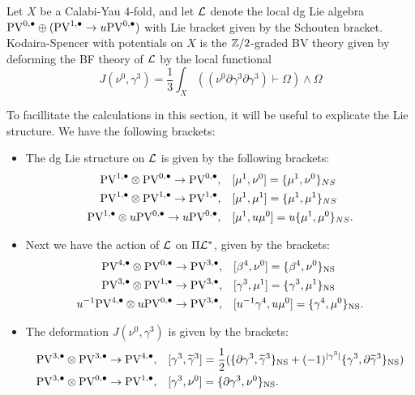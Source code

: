\documentclass[11pt]{amsart}
\def\PV{{\rm PV}}
\begin{document}
\begin{dfn}
  Let $X$ be a Calabi-Yau 4-fold, and let $\mathcal L$ denote the local dg Lie algebra $\PV^{0,\bu}\oplus (\PV^{1,\bu}\to u\PV^{0,\bu})$ with Lie bracket given by the Schouten bracket. Kodaira-Spencer with potentials on $X$ is the $\mathbb Z/2$-graded BV theory given by deforming the BF theory of $\mathcal L$ by the local functional \[ J(\nu^{0}, \gamma^{3})=\frac{1}{3}\int_{X}\left((\nu^{0}\partial\gamma^{3}\partial\gamma^{3})\vdash\Omega\right) \wedge \Omega\]\end{dfn}

To facillitate the calculations in this section, it will be useful to explicate the Lie structure. We have the following brackets:

\begin{itemize}
\item The dg Lie structure on $\mathcal L$ is given by the following brackets:
\begin{align*}
  \PV^{1,\bu}\otimes\PV^{0,\bu}\to \PV^{0,\bu},\ \ \ & [\mu^{1},\nu^{0}] = \{\mu^{1},\nu^{0}\}_{NS}  \\
  \PV^{1,\bu}\otimes\PV^{1,\bu}\to\PV^{1,\bu},\ \ \ & [\mu^{1}, \mu^{1}] = \{\mu^{1}, \mu^{1}\}_{NS} \\
  \PV^{1,\bu}\otimes u\PV^{0,\bu}\to u\PV^{0,\bu}, \ \ \ & [\mu^{1}, u\mu^{0}]=u\{\mu^{1},\mu^{0}\}_{NS}.
\end{align*}

\item Next we have the action of $\mathcal L$ on $\Pi\mathcal L^{*}$, given by the brackets:
\begin{align}
  \PV^{4,\bu}\otimes \PV^{0,\bu}\to \PV^{3,\bu}, \ \ \ & [\beta^{4}, \nu^{0}] = \{\beta^{4}, \nu^{0}\}_{\rm {NS}} \nonumber\\
  \PV^{3,\bu}\otimes \PV^{1,\bu}\to \PV^{3,\bu}, \ \ \ & [\gamma^{3}, \mu^{1}] = \{\gamma^{3}, \mu^{1}\}_{\rm NS} \label{funnybracket}\\
  u^{-1}\PV^{4,\bu}\otimes u\PV^{0,\bu}\to \PV^{3,\bu}, \ \ \ & [u^{-1}\gamma^{4}, u\mu^{0}] = \{\gamma^{4},\mu^{0}\}_{\rm NS}\label{funnybracketdesc}.
\end{align}

\item The deformation $J(\nu^{0},\gamma^{3})$ is given by the brackets:
\begin{align*}
  \PV^{3,\bu}\otimes \PV^{3,\bu}\to \PV^{4,\bu}, \ \ \ & [\gamma^3, \Tilde{\gamma}^3] = \frac{1}{2}(\{\partial \gamma^3 , \Tilde{\gamma}^{3}\}_{\rm NS} +(-1)^{|\gamma^{3}|} \{\gamma^3, \partial \Tilde{\gamma}^{3}\}_{\rm NS}) \\
\PV^{3,\bu}\otimes \PV^{0,\bu}\to \PV^{1,\bu}, \ \ \ & [\gamma^{3}, \nu^{0}] = \{\partial\gamma^{3}, \nu^{0}\}_{\rm NS}.
\end{align*}
\end{itemize}
\end{document}
